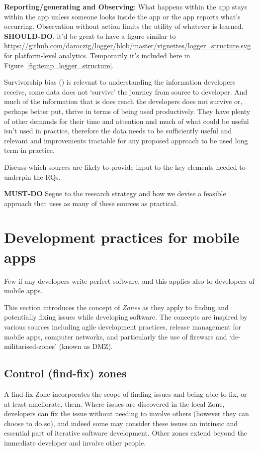 \textbf{Reporting/generating and Observing}: What happens within the app stays within the app unless someone looks inside the app or the app reports what's occurring. Observation without action limits the utility of whatever is learned.  \textbf{SHOULD-DO}, it'd be great to have a figure similar to \url{https://github.com/daroczig/logger/blob/master/vignettes/logger_structure.svg} for platform-level analytics. Temporarily it's included here in Figure~\ref{fig:temp_logger_structure}.


Survivorship bias () is relevant to understanding the information developers receive, some data does not `survive' the journey from source to developer. And much of the information that is does reach the developers does not survive or, perhaps better put, thrive in terms of being used productively. They have plenty of other demands for their time and attention and much of what could be useful isn't used in practice, therefore the data needs to be sufficiently useful and relevant and improvements tractable for any proposed approach to be used long term in practice.


Discuss which sources are likely to provide input to the key elements needed to underpin the RQs.

\textbf{MUST-DO} Segue to the research strategy and how we devise a feasible approach that uses as many of these sources as practical.



\section{Development practices for mobile apps}
Few if any developers write perfect software, and this applies also to developers of mobile apps. 


This section introduces the concept of \textit{Zones} as they apply to finding and potentially fixing issues while developing software. The concepts are inspired by various sources including agile development practices, release management for mobile apps, computer networks, and particularly the use of firewars and `de-militarised-zones' (known as DMZ). 

\subsection{Control (find-fix) zones}
A find-fix Zone incorporates the scope of finding issues and being able to fix, or at least ameliorate, them. Where issues are discovered in the local Zone, developers can fix the issue without needing to involve others (however they can choose to do so), and indeed some may consider these issues an intrinsic and essential part of iterative software development. Other zones extend beyond the immediate developer and involve other people.

